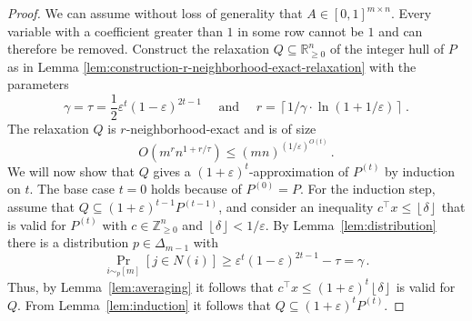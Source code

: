 \documentclass[11pt]{article}
\newcommand{\R}{\mathbb{R}}
\newcommand{\Z}{\mathbb{Z}}
\newcommand{\floor}[1]{\left\lfloor #1 \right\rfloor}
\newcommand{\ceil}[1]{\left\lceil #1 \right\rceil}
\newcommand{\proba}{\Pr}
\newcommand{\eps}{\varepsilon}
\newcommand{\numrounds}{t}
\newcommand{\covproba}{\gamma}
\newcommand{\numrows}{r}
\newcommand{\threshold}{\tau}
\theoremstyle{remark}
\begin{document}
\begin{proof}
	We can assume without loss of generality that $A\in [0,1]^{m\times n}$. Every variable
	with a coefficient greater than $1$ in some row cannot be $1$ and can therefore be removed.
    Construct the relaxation $Q \subseteq \R^n_{\geq 0}$ of the integer hull of $P$ as in Lemma \ref{lem:construction-r-neighborhood-exact-relaxation} with the parameters
    \begin{equation*}
	    \gamma = \threshold = \frac{1}{2} \eps^{\numrounds} (1-\eps)^{2\numrounds-1} \quad \text{ and }
    \quad \numrows = \ceil{1/\covproba \cdot \ln (1+1/\eps)} \,.
    \end{equation*}
	The relaxation $Q$ is $r$-neighborhood-exact and is of size
	\begin{equation*}
		O(m^r n^{1 + r/\tau}) \le (mn)^{(1/\eps)^{O(t)}} \, .
	\end{equation*}
	We will now show that $Q$ gives a $(1+\eps)^\numrounds$-approximation of $P^{(\numrounds)}$ by induction on $t$. The base case $t=0$ holds because of $P^{(0)} = P$. For the induction step, assume that $Q\subseteq (1+\eps)^{t-1}P^{(t-1)}$, and consider an inequality $c^\intercal x \le \floor{\delta}$ that is valid for $P^{(\numrounds)}$ with $c \in \Z^n_{\ge 0}$ and $\floor{\delta} < 1/\eps$.
	By Lemma~\ref{lem:distribution} there is a distribution $p\in \Delta_{m-1}$ with
	\begin{equation*}
		\proba_{i \sim_p [m]} [j \in N(i)] \ge \eps^{\numrounds} (1-\eps)^{2\numrounds-1} - \tau = \gamma \,.
	\end{equation*}
	Thus, by Lemma~\ref{lem:averaging} it follows that $c^\intercal x \le (1+\eps)^\numrounds \floor{\delta}$ is valid for $Q$. From Lemma~\ref{lem:induction} it follows that $Q\subseteq (1 + \eps)^t P^{(t)}$.
\end{proof}

\end{document}
